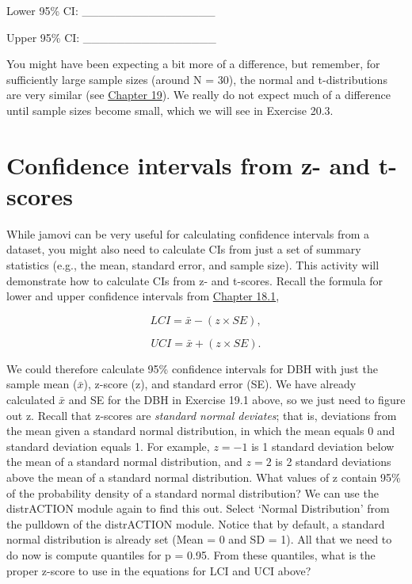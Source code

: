 \documentclass[
]{scrbook}
\begin{document}
Lower 95\% CI: \_\_\_\_\_\_\_\_\_\_\_\_\_\_\_\_

Upper 95\% CI: \_\_\_\_\_\_\_\_\_\_\_\_\_\_\_\_

You might have been expecting a bit more of a difference, but remember, for sufficiently large sample sizes (around N = 30), the normal and t-distributions are very similar (see \protect\hyperlink{Chapter_19}{Chapter 19}).
We really do not expect much of a difference until sample sizes become small, which we will see in Exercise 20.3.

\hypertarget{confidence-intervals-from-z--and-t-scores}{%
\section{Confidence intervals from z- and t-scores}\label{confidence-intervals-from-z--and-t-scores}}

While jamovi can be very useful for calculating confidence intervals from a dataset, you might also need to calculate CIs from just a set of summary statistics (e.g., the mean, standard error, and sample size).
This activity will demonstrate how to calculate CIs from z- and t-scores.
Recall the formula for lower and upper confidence intervals from \protect\hyperlink{Chapter_18.htmlux5cux23normal-distribution-cis}{Chapter 18.1},

\[LCI = \bar{x} - (z \times SE),\]

\[UCI = \bar{x} + (z \times SE).\]

We could therefore calculate 95\% confidence intervals for DBH with just the sample mean (\(\bar{x}\)), z-score (z), and standard error (SE).
We have already calculated \(\bar{x}\) and SE for the DBH in Exercise 19.1 above, so we just need to figure out z.
Recall that z-scores are \emph{standard normal deviates}; that is, deviations from the mean given a standard normal distribution, in which the mean equals 0 and standard deviation equals 1.
For example, \(z = -1\) is 1 standard deviation below the mean of a standard normal distribution, and \(z = 2\) is 2 standard deviations above the mean of a standard normal distribution.
What values of z contain 95\% of the probability density of a standard normal distribution?
We can use the distrACTION module again to find this out.
Select `Normal Distribution' from the pulldown of the distrACTION module.
Notice that by default, a standard normal distribution is already set (Mean = 0 and SD = 1).
All that we need to do now is compute quantiles for p = 0.95.
From these quantiles, what is the proper z-score to use in the equations for LCI and UCI above?
\end{document}
